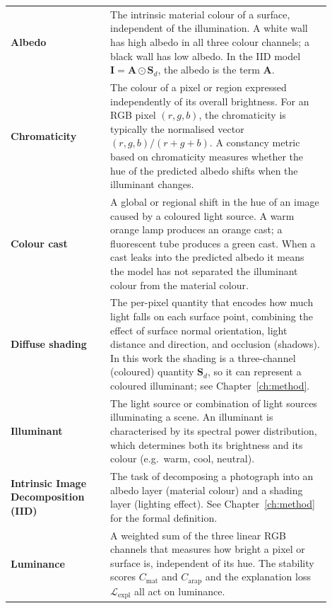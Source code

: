 \begin{longtable}{p{0.28\linewidth} p{0.62\linewidth}}

\textbf{Albedo}
  & The intrinsic material colour of a surface, independent of the illumination.
    A white wall has high albedo in all three colour channels; a black wall has
    low albedo.  In the IID model $\mathbf{I} = \mathbf{A} \odot \mathbf{S}_d$, the albedo
    is the term $\mathbf{A}$. \\[4pt]

\textbf{Chromaticity}
  & The colour of a pixel or region expressed independently of its overall
    brightness.  For an RGB pixel $(r, g, b)$, the chromaticity is typically
    the normalised vector $(r, g, b) / (r + g + b)$.  A constancy metric
    based on chromaticity measures whether the hue of the predicted albedo
    shifts when the illuminant changes. \\[4pt]

\textbf{Colour cast}
  & A global or regional shift in the hue of an image caused by a coloured
    light source.  A warm orange lamp produces an orange cast; a fluorescent
    tube produces a green cast.  When a cast leaks into the predicted albedo
    it means the model has not separated the illuminant colour from the
    material colour. \\[4pt]

\textbf{Diffuse shading}
  & The per-pixel quantity that encodes how much light falls on each surface
    point, combining the effect of surface normal orientation, light distance
    and direction, and occlusion (shadows).  In this work the shading is a
    three-channel (coloured) quantity $\mathbf{S}_d$, so it can represent a
    coloured illuminant; see Chapter~\ref{ch:method}. \\[4pt]

\textbf{Illuminant}
  & The light source or combination of light sources illuminating a scene.
    An illuminant is characterised by its spectral power distribution, which
    determines both its brightness and its colour (e.g.\ warm, cool, neutral). \\[4pt]

\textbf{Intrinsic Image Decomposition (IID)}
  & The task of decomposing a photograph into an albedo layer (material colour)
    and a shading layer (lighting effect).  See Chapter~\ref{ch:method} for
    the formal definition. \\[4pt]

\textbf{Luminance}
  & A weighted sum of the three linear RGB channels that measures how bright a pixel or
    surface is, independent of its hue. The stability scores $C_{\text{mat}}$ and
    $C_{\text{arap}}$ and the explanation loss $\mathcal{L}_{\text{expl}}$ all act on
    luminance. \\[4pt]


\end{longtable}

